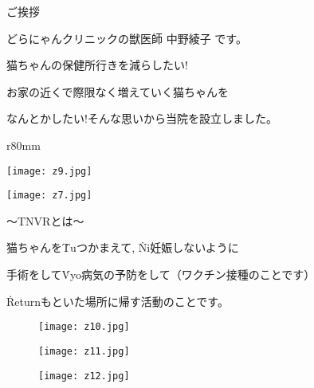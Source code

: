 \documentclass{jsarticle}
\begin{document}
\huge
\begin{center}
ご挨拶
\end{center}
\hspace{10pt}どらにゃんクリニックの獣医師 中野綾子 です。

\noindent 猫ちゃんの保健所行きを減らしたい!

\noindent お家の近くで際限なく増えていく猫ちゃんを

\noindent なんとかしたい!そんな思いから当院を設立しました。


\begin{wrapfigure}[1]{r}{80mm}
	\vspace*{-70pt}
	\begin{minipage}{0.2\columnwidth}
		\centering
		\texttt{[image: z9.jpg]}
		\captionsetup{labelformat=empty,labelsep=none}
		\caption{}
		\label{}
	\end{minipage}
	\begin{minipage}{0.2\columnwidth}
		\centering
		\texttt{[image: z7.jpg]}
		\captionsetup{labelformat=empty,labelsep=none}
		\caption{}
		\label{}
	\end{minipage}
\end{wrapfigure}

\vspace{60pt}
～TNVRとは～
\vspace{50pt}

\noindent 猫ちゃんを\.{T}uつかまえて, \.{N}i妊娠しないように

\noindent 手術をして\.{V}yo病気の予防をして（ワクチン接種のことです）

\noindent \.{R}eturnもといた場所に帰す活動のことです。

\begin{figure}[htbp]
	\centering
	\begin{minipage}{0.25\columnwidth}
		\centering
		\texttt{[image: z10.jpg]}
		\captionsetup{labelformat=empty,labelsep=none}
		\caption{}
		\label{}
	\end{minipage}
	\begin{minipage}{0.25\columnwidth}
		\centering
		\texttt{[image: z11.jpg]}
		\captionsetup{labelformat=empty,labelsep=none}
		\caption{}
		\label{}
	\end{minipage}
		\begin{minipage}{0.45\columnwidth}
		\centering
		\texttt{[image: z12.jpg]}
		\captionsetup{labelformat=empty,labelsep=none}
		\caption{}
		\label{}
	\end{minipage}
\end{figure}
\end{document}
